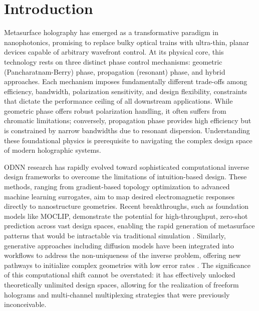 \section{Introduction}\label{introduction}

Metasurface holography has emerged as a transformative paradigm in nanophotonics, promising to replace bulky optical trains with ultra-thin, planar devices capable of arbitrary wavefront control. At its physical core, this technology rests on three distinct phase control mechanisms: geometric (Pancharatnam-Berry) phase, propagation (resonant) phase, and hybrid approaches. Each mechanism imposes fundamentally different trade-offs among efficiency, bandwidth, polarization sensitivity, and design flexibility, constraints that dictate the performance ceiling of all downstream applications. While geometric phase offers robust polarization handling, it often suffers from chromatic limitations; conversely, propagation phase provides high efficiency but is constrained by narrow bandwidths due to resonant dispersion. Understanding these foundational physics is prerequisite to navigating the complex design space of modern holographic systems.

ODNN research has rapidly evolved toward sophisticated computational inverse design frameworks to overcome the limitations of intuition-based design. These methods, ranging from gradient-based topology optimization \citep{doi_10_2528_pier12020501_bb5007b1} to advanced machine learning surrogates, aim to map desired electromagnetic responses directly to nanostructure geometries. Recent breakthroughs, such as foundation models like MOCLIP, demonstrate the potential for high-throughput, zero-shot prediction across vast design spaces, enabling the rapid generation of metasurface patterns that would be intractable via traditional simulation \citep{doi_10_1038_s41467_026_76714_x_8ca5d39b}. Similarly, generative approaches including diffusion models have been integrated into workflows to address the non-uniqueness of the inverse problem, offering new pathways to initialize complex geometries with low error rates \citep{doi_10_48550_arxiv_2506_21748_dc49c062}. The significance of this computational shift cannot be overstated: it has effectively unlocked theoretically unlimited design spaces, allowing for the realization of freeform holograms and multi-channel multiplexing strategies that were previously inconceivable.

